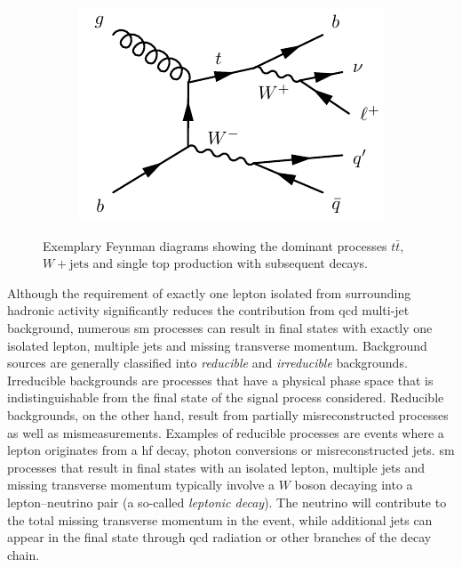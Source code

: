 \begin{figure}
\begin{subfigure}[b]{0.3\linewidth}
		\centering\includegraphics[width=\textwidth]{singletop}
		\caption{\label{fig:singletop}}
	\end{subfigure}	
	\caption{Exemplary Feynman diagrams showing the dominant processes  $t\bar{t}$,  $W+\textrm{jets}$ and  single top production with subsequent decays.}
	\label{fig:sm_backgrounds_feynman}
\end{figure}

Although the requirement of exactly one lepton isolated from surrounding hadronic activity significantly reduces the contribution from \gls{qcd} multi-jet background, numerous \gls{sm} processes can result in final states with exactly one isolated lepton, multiple jets and missing transverse momentum. Background sources are generally classified into \textit{reducible} and \textit{irreducible} backgrounds. Irreducible backgrounds are processes that have a physical phase space that is indistinguishable from the final state of the signal process considered. Reducible backgrounds, on the other hand, result from partially misreconstructed processes as well as mismeasurements. Examples of reducible processes are events where a lepton originates from a \gls{hf} decay, photon conversions or misreconstructed jets. \gls{sm} processes that result in final states with an isolated lepton, multiple jets and missing transverse momentum typically involve a $W$ boson decaying into a lepton--neutrino pair (a so-called \textit{leptonic decay}). The neutrino will contribute to the total missing transverse momentum in the event, while additional jets can appear in the final state through \gls{qcd} radiation or other branches of the decay chain.

